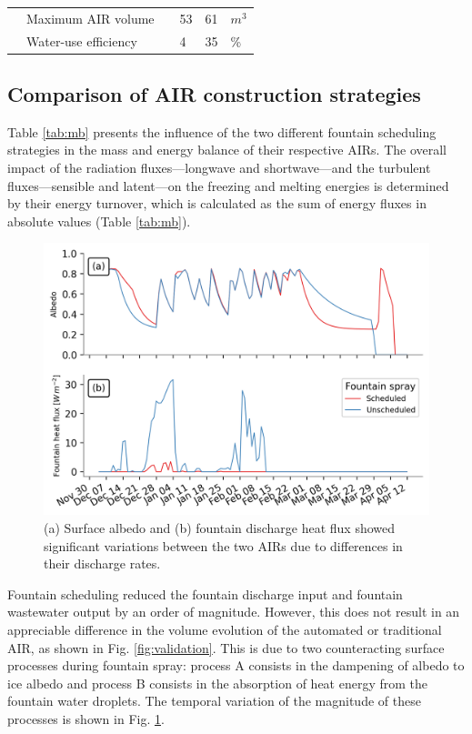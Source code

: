 \documentclass[tc, manuscript]{copernicus}
\begin{document}
\begin{table}
\begin{tabular}{@{}|llllll|@{}}
		                       & Maximum AIR volume              &                 & 53            & 61            & $m^{3}$ \\
		\multicolumn{1}{|l|}{} & Water-use efficiency            &                 & 4             & 35            & \% \\\midrule
	\end{tabular}
\end{table}

\subsection{Comparison of AIR construction strategies}

Table \ref{tab:mb} presents the influence of the two different fountain scheduling strategies in the mass and energy balance
of their respective AIRs.  The overall impact of the radiation fluxes---longwave and shortwave---and the
turbulent fluxes---sensible and latent---on the freezing and melting energies is determined by their 
energy turnover, which is calculated as the sum of energy fluxes in absolute values (Table
\ref{tab:mb}). 

\begin{figure}[htb]
\includegraphics[width=12cm]{Figures/dis_processes.png}
\caption{(a) Surface albedo  and (b) fountain discharge heat flux showed significant variations between the two
  AIRs due to differences in their discharge rates.}
\label{fig:dis_processes}
\end{figure}

Fountain scheduling reduced the fountain discharge input and fountain wastewater output by an order of
magnitude. However, this does not result in an appreciable difference in the volume evolution of the automated
or traditional AIR, as shown in Fig. \ref{fig:validation}. This is due to two counteracting surface processes
during fountain spray: process A consists in the dampening of albedo to ice albedo and process B consists in the absorption of heat energy from the
fountain water droplets. The temporal variation of the magnitude of these processes is shown in Fig.
\ref{fig:dis_processes}.
\end{document}
